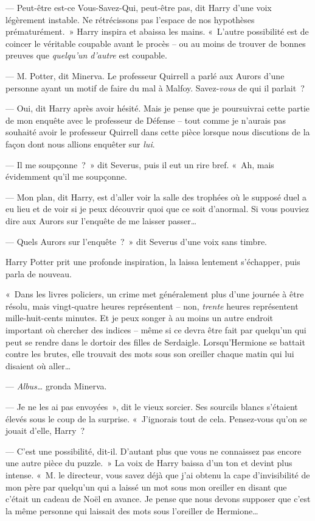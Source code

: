 --- Peut-être est-ce Vous-Savez-Qui, peut-être pas, dit Harry d'une voix légèrement instable. Ne rétrécissons pas l'espace de nos hypothèses prématurément.~» Harry inspira et abaissa les mains. «~L'autre possibilité est de coincer le véritable coupable avant le procès -- ou au moins de trouver de bonnes preuves que \emph{quelqu'un d'autre} est coupable.

--- M. Potter, dit Minerva. Le professeur Quirrell a parlé aux Aurors d'une personne ayant un motif de faire du mal à Malfoy. Savez-\emph{vous} de qui il parlait~?

--- Oui, dit Harry après avoir hésité. Mais je pense que je poursuivrai cette partie de mon enquête avec le professeur de Défense -- tout comme je n'aurais pas souhaité avoir le professeur Quirrell dans cette pièce lorsque nous discutions de la façon dont nous allions enquêter sur \emph{lui}.

--- Il me soupçonne~?~» dit Severus, puis il eut un rire bref. «~Ah, mais évidemment qu'il me soupçonne.

--- Mon plan, dit Harry, est d'aller voir la salle des trophées où le supposé duel a eu lieu et de voir si je peux découvrir quoi que ce soit d'anormal. Si vous pouviez dire aux Aurors sur l'enquête de me laisser passer…

--- Quels Aurors sur l'enquête~?~» dit Severus d'une voix sans timbre.

Harry Potter prit une profonde inspiration, la laissa lentement s'échapper, puis parla de nouveau.

«~Dans les livres policiers, un crime met généralement plus d'une journée à être résolu, mais vingt-quatre heures représentent -- non, \emph{trente} heures représentent mille-huit-cents minutes. Et je peux songer à au moins un autre endroit important où chercher des indices -- même si ce devra être fait par quelqu'un qui peut se rendre dans le dortoir des filles de Serdaigle. Lorsqu'Hermione se battait contre les brutes, elle trouvait des mots sous son oreiller chaque matin qui lui disaient où aller…

--- \emph{Albus…} gronda Minerva.

--- Je ne les ai pas envoyées~», dit le vieux sorcier. Ses sourcils blancs s'étaient élevés sous le coup de la surprise. «~J'ignorais tout de cela. Pensez-vous qu'on se jouait d'elle, Harry~?

--- C'est une possibilité, dit-il. D'autant plus que vous ne connaissez pas encore une autre pièce du puzzle.~» La voix de Harry baissa d'un ton et devint plus intense. «~M. le directeur, vous savez déjà que j'ai obtenu la cape d'invisibilité de mon père par quelqu'un qui a laissé un mot sous mon oreiller en disant que c'était un cadeau de Noël en avance. Je pense que nous devons supposer que c'est la même personne qui laissait des mots sous l'oreiller de Hermione…


